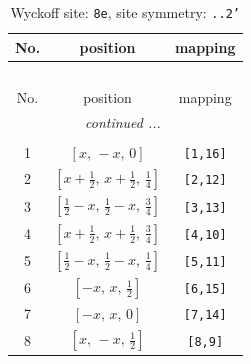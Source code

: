 \documentclass[fleqn,8pt]{jsarticle}
\begin{document}
\begin{longtable}{ccc}
\caption{Wyckoff site: {\tt 8e}, site symmetry: {\tt ..2'}}
 \\
 \hline \hline
No. & position & mapping \\ \hline \endfirsthead

\multicolumn{2}{l}{\tablename\ \thetable{}} \\
 \hline \hline
No. & position & mapping \\ \hline \endhead

 \hline \hline
\multicolumn{2}{r}{\footnotesize\it continued ...} \\ \endfoot

 \hline \hline
\multicolumn{2}{r}{} \\ \endlastfoot

1 & $\left[ x,\, - x,\, 0 \right]$ & {\tt [1,16]} \\ \hline
2 & $\left[ x + \frac{1}{2},\, x + \frac{1}{2},\, \frac{1}{4} \right]$ & {\tt [2,12]} \\ \hline
3 & $\left[ \frac{1}{2} - x,\, \frac{1}{2} - x,\, \frac{3}{4} \right]$ & {\tt [3,13]} \\ \hline
4 & $\left[ x + \frac{1}{2},\, x + \frac{1}{2},\, \frac{3}{4} \right]$ & {\tt [4,10]} \\ \hline
5 & $\left[ \frac{1}{2} - x,\, \frac{1}{2} - x,\, \frac{1}{4} \right]$ & {\tt [5,11]} \\ \hline
6 & $\left[ - x,\, x,\, \frac{1}{2} \right]$ & {\tt [6,15]} \\ \hline
7 & $\left[ - x,\, x,\, 0 \right]$ & {\tt [7,14]} \\ \hline
8 & $\left[ x,\, - x,\, \frac{1}{2} \right]$ & {\tt [8,9]} \\
\end{longtable}
\renewcommand{\arraystretch}{1.2}
\end{document}
